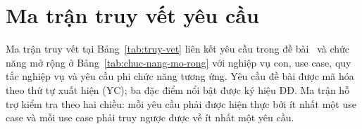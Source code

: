 \section{Ma trận truy vết yêu cầu}\label{pl:truy-vet}

Ma trận truy vết tại Bảng~\ref{tab:truy-vet} liên kết yêu cầu trong đề bài~\cite{debai} và chức năng mở rộng ở Bảng~\ref{tab:chuc-nang-mo-rong} với nghiệp vụ con, use case, quy tắc nghiệp vụ và yêu cầu phi chức năng tương ứng. Yêu cầu đề bài được mã hóa theo thứ tự xuất hiện (YC); ba đặc điểm nổi bật được ký hiệu ĐĐ. Ma trận hỗ trợ kiểm tra theo hai chiều: mỗi yêu cầu phải được hiện thực bởi ít nhất một use case và mỗi use case phải truy ngược được về ít nhất một yêu cầu.


